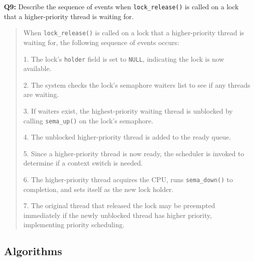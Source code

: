 \documentclass[a4paper,11pt]{paper}
\begin{document}
\textbf{Q9:} Describe the sequence of events when \texttt{lock\_release()} is called on a lock that a higher-priority thread is waiting for.
\begin{quote}
When \texttt{lock\_release()} is called on a lock that a higher-priority thread is waiting for, the following sequence of events occurs:

1. The lock's \texttt{holder} field is set to \texttt{NULL}, indicating the lock is now available.

2. The system checks the lock's semaphore waiters list to see if any threads are waiting.

3. If waiters exist, the highest-priority waiting thread is unblocked by calling \texttt{sema\_up()} on the lock's semaphore.

4. The unblocked higher-priority thread is added to the ready queue.

5. Since a higher-priority thread is now ready, the scheduler is invoked to determine if a context switch is needed.

6. The higher-priority thread acquires the CPU, runs \texttt{sema\_down()} to completion, and sets itself as the new lock holder.

7. The original thread that released the lock may be preempted immediately if the newly unblocked thread has higher priority, implementing priority scheduling.

\end{quote}


\subsection{Algorithms}
\end{document}
